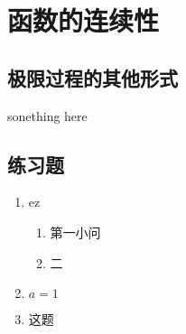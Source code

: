 \chapter{函数的连续性}
\section{极限过程的其他形式}
sonething here

\section*{练习题}
\noindent \hrulefill

\begin{enumerate}[1.]
\item ez
	\begin{enumerate}[(1).]
	\item 第一小问
	\item 二
	\end{enumerate}
\item  $ a = 1 $ 
\item 这题\label{习题2.5.9}
\end{enumerate}

\noindent \hrulefill